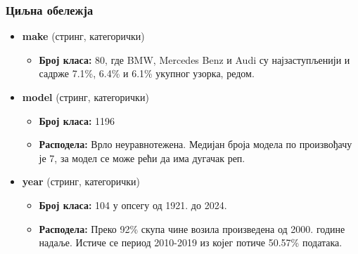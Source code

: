 \documentclass{article}
\begin{document}
  \subsubsection*{Циљна обележја}
  \begin{itemize}
    \item \textbf{make} (стринг, категорички)
      \begin{itemize}
        \item \textbf{Број класа:} 80, где BMW, Mercedes Benz и Audi су најзаступљенији и садрже 7.1\%, 6.4\% и 6.1\% укупног узорка, редом. 
      \end{itemize}
   \item \textbf{model} (стринг, категорички)
    \begin{itemize}
      \item \textbf{Број класа:} 1196
      \item \textbf{Расподела:} Врло неуравнотежена. Медијан броја модела по произвођачу је 7, за модел се може рећи да има дугачак реп.
    \end{itemize}
    \item \textbf{year} (стринг, категорички)
    \begin{itemize}
      \item \textbf{Број класа:} 104 у опсегу од 1921. до 2024.
      \item \textbf{Расподела:} Преко 92\% скупа чине возила произведена од 2000. године надаље. Истиче се период 2010-2019 из којег потиче 50.57\% података.
    \end{itemize}
 \end{itemize}
\end{document}
